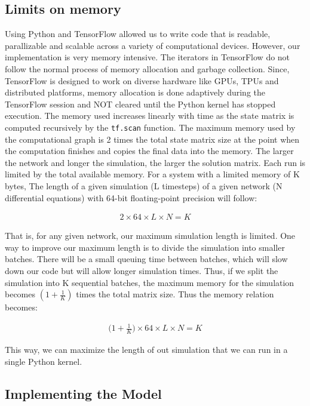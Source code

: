 \documentclass[10pt,letterpaper]{article}
\begin{document}
\subsection*{Limits on memory}

Using Python and TensorFlow allowed us to write code that is readable, parallizable and scalable across a variety of computational devices. However, our implementation is very memory intensive. The iterators in TensorFlow do not follow the normal process of memory allocation and garbage collection. Since, TensorFlow is designed to work on diverse hardware like GPUs, TPUs and distributed platforms, memory allocation is done adaptively during the TensorFlow session and NOT cleared until the Python kernel has stopped execution. The memory used increases linearly with time as the state matrix is computed recursively by the \texttt{tf.scan} function. The maximum memory used by the computational graph is 2 times the total state matrix size at the point when the computation finishes and copies the final data into the memory. The larger the network and longer the simulation, the larger the solution matrix. Each run is limited by the total available memory. For a system with a limited memory of K bytes, The length of a given simulation (L timesteps) of a given network (N differential equations) with 64-bit floating-point precision will follow: 

\begin{eqnarray}2\times64\times L\times N=K\end{eqnarray}

That is, for any given network, our maximum simulation length is limited. One way to improve our maximum length is to divide the simulation into smaller batches. There will be a small queuing time between batches, which will slow down our code but will allow longer simulation times. Thus, if we split the simulation into K sequential batches, the maximum memory for the simulation becomes $(1+\frac{1}{K})$ times the total matrix size. Thus the memory relation becomes:  

\begin{eqnarray}\Big(1+\frac{1}{K}\Big)\times64\times L\times N=K\end{eqnarray}

This way, we can maximize the length of out simulation that we can run in a single Python kernel.

\subsection*{Implementing the Model}
\end{document}
